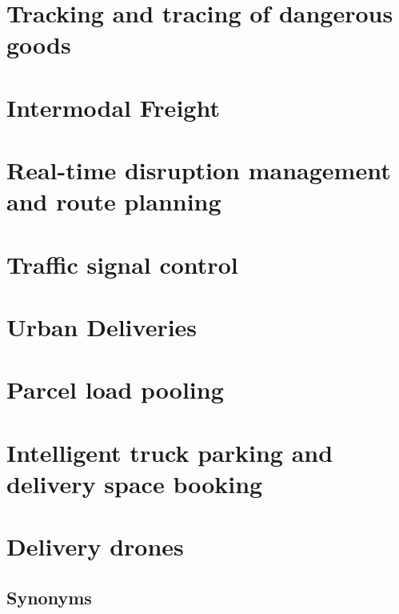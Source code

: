 \documentclass[
]{book}
\begin{document}
\hypertarget{tracking-and-tracing-of-dangerous-goods}{%
\section{Tracking and tracing of dangerous goods}\label{tracking-and-tracing-of-dangerous-goods}}

\hypertarget{intermodal-freight}{%
\section{Intermodal Freight}\label{intermodal-freight}}

\hypertarget{real-time-disruption-management-and-route-planning}{%
\section{Real-time disruption management and route planning}\label{real-time-disruption-management-and-route-planning}}

\hypertarget{traffic-signal-control}{%
\section{Traffic signal control}\label{traffic-signal-control}}

\hypertarget{urban-deliveries}{%
\section{Urban Deliveries}\label{urban-deliveries}}

\hypertarget{parcel-load-pooling}{%
\section{Parcel load pooling}\label{parcel-load-pooling}}

\hypertarget{intelligent-truck-parking-and-delivery-space-booking}{%
\section{Intelligent truck parking and delivery space booking}\label{intelligent-truck-parking-and-delivery-space-booking}}

\hypertarget{delivery-drones}{%
\section{Delivery drones}\label{delivery-drones}}

\hypertarget{synonyms-7}{%
\subsection*{Synonyms}\label{synonyms-7}}
\end{document}
